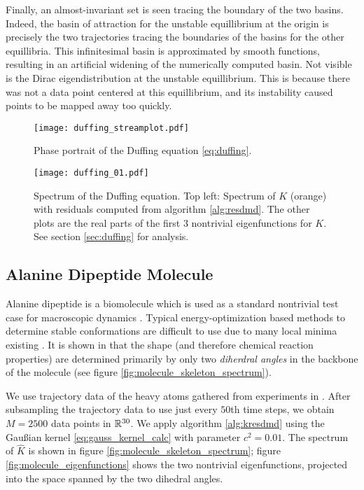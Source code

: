 Finally, an almost-invariant set is seen tracing 
the boundary of the two basins. Indeed, the basin of attraction for the unstable 
equillibrium  at the origin is precisely the two trajectories tracing the boundaries of the 
basins for the other equillibria. This infinitesimal basin is approximated by smooth 
functions, resulting in an artificial widening of the numerically computed basin. Not visible 
is the Dirac eigendistribution at the unstable equillibrium. This is because there was not 
a data point centered at this equillibrium, and its instability caused points to be mapped 
away too quickly. 


\begin{figure}
    \centering
    \texttt{[image: duffing\_streamplot.pdf]}
    \caption{
        Phase portrait of the Duffing equation \ref{eq:duffing}. 
    }\label{fig:duffing_streamplot}
\end{figure}

\begin{figure}
    \centering
    \texttt{[image: duffing\_01.pdf]}
    \caption{
        Spectrum of the Duffing equation. Top left: Spectrum of $K$ (orange) with 
        residuals computed from algorithm \ref{alg:resdmd}. The other plots are the 
        real parts of the first $3$ nontrivial eigenfunctions for $K$. See section 
        \ref{sec:duffing} for analysis. 
    }\label{fig:duffing}
\end{figure}

\subsection{Alanine Dipeptide Molecule}\label{sec:molecule}

Alanine dipeptide is a biomolecule which is used as a standard nontrivial test case 
for macroscopic dynamics \cite{entropic}. Typical energy-optimization based methods 
to determine stable conformations are difficult to use due to many local minima 
existing \cite{molecule}. It is shown in \cite{molecule} that the shape (and therefore 
chemical reaction properties) are determined primarily by only two \emph{diherdral angles} 
in the backbone of the molecule (see figure \ref{fig:molecule_skeleton_spectrum}). 

We use trajectory data of the heavy atoms gathered from experiments in 
\cite{molecule_experiment}. After subsampling the trajectory data to use just every $50$th 
time steps, we obtain $M = 2500$ data points in $\mathbb{R}^{30}$. We apply algorithm 
\ref{alg:kresdmd} using the Gaußian kernel \ref{eq:gauss_kernel_calc} with parameter 
$c^2 = 0.01$. The spectrum of $\widehat{ K }$ is shown in figure 
\ref{fig:molecule_skeleton_spectrum}; figure \ref{fig:molecule_eigenfunctions} shows the 
two nontrivial eigenfunctions, projected into the space spanned by the two dihedral angles. 

